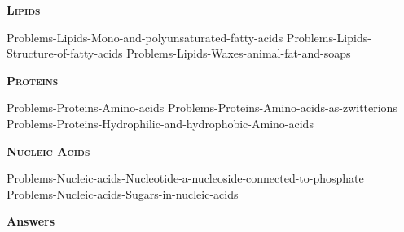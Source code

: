 \documentclass[main.tex]{subfiles}
\begin{document}
\begin{multicols*}{2}
{\raggedright\textsc{\textbf{Lipids}}\par}


 {Problems-Lipids-Mono-and-polyunsaturated-fatty-acids}
 {Problems-Lipids-Structure-of-fatty-acids}
 {Problems-Lipids-Waxes-animal-fat-and-soaps}


 





{\raggedright\textsc{\textbf{Proteins}}\par}




  {Problems-Proteins-Amino-acids}
 {Problems-Proteins-Amino-acids-as-zwitterions}
 {Problems-Proteins-Hydrophilic-and-hydrophobic-Amino-acids}





 

 

{\raggedright\textsc{\textbf{Nucleic Acids}}\par}


 {Problems-Nucleic-acids-Nucleotide-a-nucleoside-connected-to-phosphate}
 {Problems-Nucleic-acids-Sugars-in-nucleic-acids}
 
 

\end{multicols*}
\newpage
\begin{answersenvironment}
\begin{minipage}[c]{1\textwidth}
\begin{localsize}{10}
{\Large \bf Answers}
 \printsolutions 
\end{localsize}
\end{minipage}\end{answersenvironment}
\end{document}
